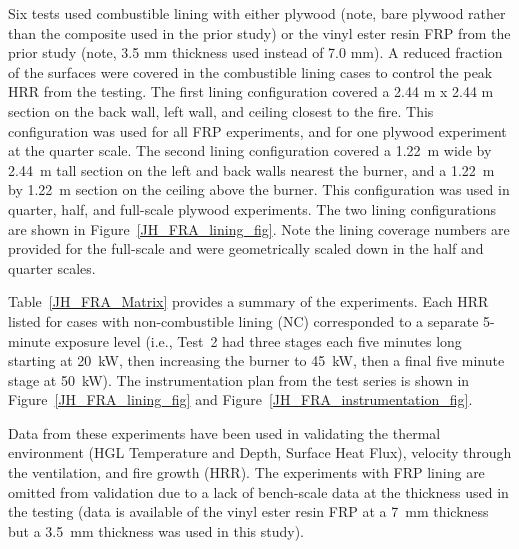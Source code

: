 Six tests used combustible lining with either plywood (note, bare plywood rather than the composite used in the prior study) or the vinyl ester resin FRP from the prior study (note, 3.5 mm thickness used instead of 7.0 mm). A reduced fraction of the surfaces were covered in the combustible lining cases to control the peak HRR from the testing. The first lining configuration covered a 2.44 m x 2.44 m section on the back wall, left wall, and ceiling closest to the fire. This configuration was used for all FRP experiments, and for one plywood experiment at the quarter scale. The second lining configuration covered a 1.22~m wide by 2.44~m tall section on the left and back walls nearest the burner, and a 1.22~m by 1.22~m section on the ceiling above the burner. This configuration was used in quarter, half, and full-scale plywood experiments. The two lining configurations are shown in Figure~\ref{JH_FRA_lining_fig}.
Note the lining coverage numbers are provided for the full-scale and were geometrically scaled down in the half and quarter scales.

Table~\ref{JH_FRA_Matrix} provides a summary of the experiments. Each HRR listed for cases with non-combustible lining (NC) corresponded to a separate 5-minute exposure level (i.e., Test~2 had three stages each five minutes long starting at 20~kW, then increasing the burner to 45~kW, then a final five minute stage at 50~kW). The instrumentation plan from the test series is shown in Figure~\ref{JH_FRA_lining_fig} and Figure~\ref{JH_FRA_instrumentation_fig}.

Data from these experiments have been used in validating the thermal environment (HGL Temperature and Depth, Surface Heat Flux), velocity through the ventilation, and fire growth (HRR). The experiments with FRP lining are omitted from validation due to a lack of bench-scale data at the thickness used in the testing (data is available of the vinyl ester resin FRP at a 7~mm thickness but a 3.5~mm thickness was used in this study).

